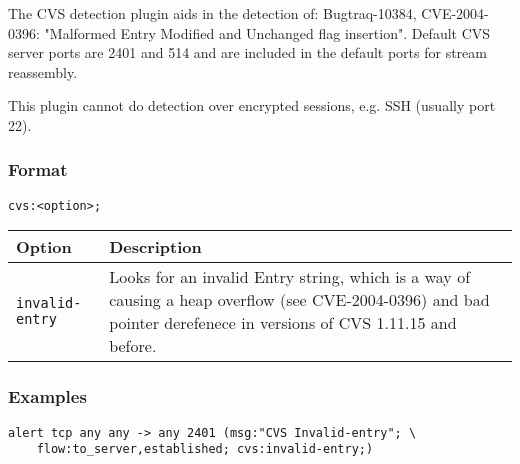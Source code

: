 \documentclass[english]{report}
\newenvironment{note}{
\samepage
    \vspace{10pt}{\textsf{
        {\hspace{7pt}\Huge{$\triangle$\hspace{-12.5pt}{\Large{$^!$}}}}\hspace{5pt}
        {\Large{NOTE}}
    }
    }
   \begin{center}
    \par\vspace{-17pt}

    \begin{lrbox}{\savepar}
    \begin{minipage}[r]{6in}
}
{
    \end{minipage}
    \end{lrbox}
    \fbox{
        \usebox{
            \savepar
	}
    }
    \par\vskip10pt
    \end{center}
}
\newenvironment{note}{
        \begin{rawhtml}
        <p><table border="1"><tr><td><b>
        Note:&nbsp;&nbsp;</b>
        \end{rawhtml}
}{
        \begin{rawhtml}
        </b></td></tr></table></p>
        \end{rawhtml}
}
\begin{document}
The CVS detection plugin aids in the detection of: Bugtraq-10384, CVE-2004-0396: "Malformed Entry Modified and Unchanged flag insertion".  Default CVS server ports are 2401 and 514 and are included in the default ports for stream reassembly.

\begin{note}
This plugin cannot do detection over encrypted sessions, e.g. SSH (usually port 22).
\end{note}

\subsubsection{Format}

\begin{verbatim}
cvs:<option>;
\end{verbatim}

\begin{tabular}{| l | p{5in} |}
\hline
{\bf Option} & {\bf Description}\\
\hline
\hline
\texttt{invalid-entry} & Looks for an invalid Entry string, which is a way of causing a heap overflow (see CVE-2004-0396) and bad pointer derefenece in versions of CVS 1.11.15 and before.\\
\hline
\end{tabular}

\subsubsection{Examples}

\begin{verbatim}
alert tcp any any -> any 2401 (msg:"CVS Invalid-entry"; \
    flow:to_server,established; cvs:invalid-entry;)
\end{verbatim}



%

%
%
%
%
\end{document}
